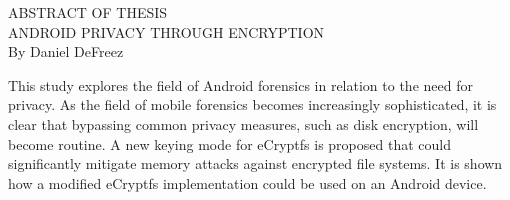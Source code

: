 \singlespacing
\begin{center}
ABSTRACT OF THESIS \\[1.0in]
ANDROID PRIVACY THROUGH ENCRYPTION \\[0.25in]
By Daniel DeFreez \\[1.25in]
\end{center}

\noindent
This study explores the field of Android forensics in relation to the need for privacy. As the field of mobile forensics becomes
increasingly sophisticated, it is clear that bypassing common privacy measures, such as disk encryption, will become routine.  A new
keying mode for eCryptfs is proposed that could significantly mitigate memory attacks against encrypted file systems. It is shown
how a modified eCryptfs implementation could be used on an Android device.
\restoregeometry
